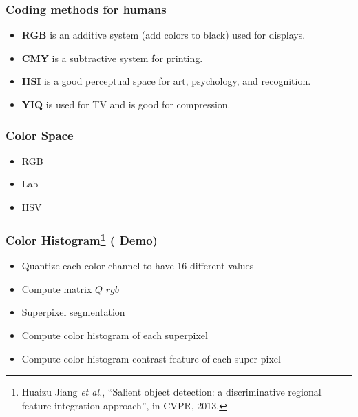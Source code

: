 \documentclass[notheorems,serif,table,compress]{beamer}  %
\begin{document}
\begin{frame}
\frametitle{Coding methods for humans}
\begin{itemize}
\item \textbf{RGB} is an additive system (add colors to black) used for displays.
\item \textbf{CMY} is a subtractive system for printing.
\item \textbf{HSI} is a good perceptual space for art, psychology, and recognition.
\item \textbf{YIQ} is used for TV and is good for compression. 
\end{itemize}
\end{frame}


\begin{frame}
\frametitle{Color Space}
\begin{itemize}
\item RGB
\item Lab
\item HSV
\end{itemize}
\end{frame}


\begin{frame}
\frametitle{Color Histogram\footnote{Huaizu Jiang \textit{et al.}, ``Salient object detection: a discriminative regional feature integration approach'', in CVPR, 2013.} (\color{yellow} \textbf{Demo})}
\begin{itemize}
\item Quantize each color channel to have 16 different values
\item Compute matrix $Q\_rgb$
\item Superpixel segmentation
\item Compute color histogram of each superpixel
\item Compute color histogram contrast feature of each super pixel
\end{itemize}
\end{frame}
\end{document}
